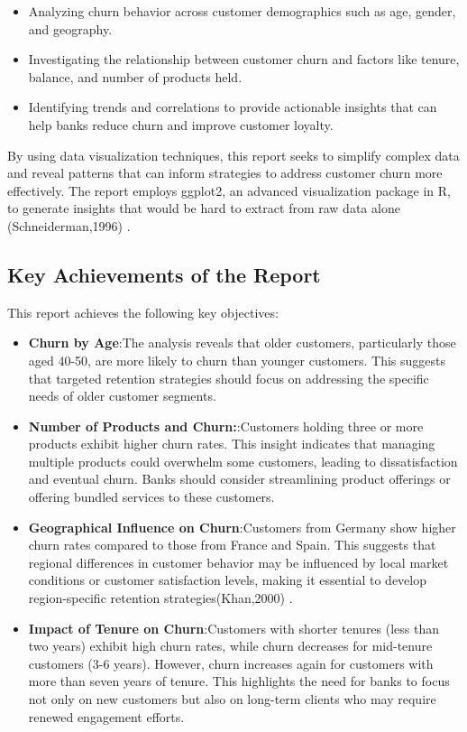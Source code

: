 \documentclass[12pt]{article}
\begin{document}
\begin{itemize}
    \item Analyzing churn behavior across customer demographics such as age, gender, and geography.
    \item Investigating the relationship between customer churn and factors like tenure, balance, and number of products held.
    \item Identifying trends and correlations to provide actionable insights that can help banks reduce churn and improve customer loyalty.
\end{itemize}

By using data visualization techniques, this report seeks to simplify complex data and reveal patterns that can inform strategies to address customer churn more effectively. The report employs ggplot2, an advanced visualization package in R, to generate insights that would be hard to extract from raw data alone (Schneiderman,1996) \cite{schneiderman1996}.

\subsection{Key Achievements of the Report}
This report achieves the following key objectives:

\begin{itemize}
    \item \textbf{Churn by Age}:The analysis reveals that older customers, particularly those aged 40-50, are more likely to churn than younger customers. This suggests that targeted retention strategies should focus on addressing the specific needs of older customer segments.
    \item \textbf{Number of Products and Churn:}:Customers holding three or more products exhibit higher churn rates. This insight indicates that managing multiple products could overwhelm some customers, leading to dissatisfaction and eventual churn. Banks should consider streamlining product offerings or offering bundled services to these customers.
    \item \textbf{Geographical Influence on Churn}:Customers from Germany show higher churn rates compared to those from France and Spain. This suggests that regional differences in customer behavior may be influenced by local market conditions or customer satisfaction levels, making it essential to develop region-specific retention strategies(Khan,2000) \cite{khan2020}.
    \item \textbf{Impact of Tenure on Churn}:Customers with shorter tenures (less than two years) exhibit high churn rates, while churn decreases for mid-tenure customers (3-6 years). However, churn increases again for customers with more than seven years of tenure. This highlights the need for banks to focus not only on new customers but also on long-term clients who may require renewed engagement efforts.
\end{itemize}
\end{document}
